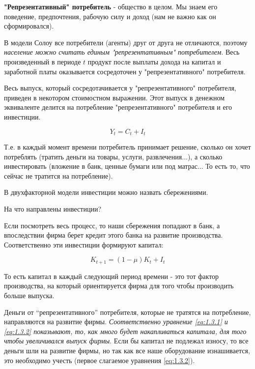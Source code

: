 \documentclass[reqno]{article}
\theoremstyle{definition}
\theoremstyle{definition}
\theoremstyle{definition}
\theoremstyle{definition}
\theoremstyle{definition}
\theoremstyle{definition}
\theoremstyle{definition}
\theoremstyle{definition}
\theoremstyle{definition}
\begin{document}
	\textbf{"Репрезентативный" потребитель} - общество в целом. Мы знаем его поведение, предпочтения, рабочую силу и доход (нам не важно как он сформировался).
	
	В модели Солоу все потребители (агенты) друг от друга не отличаются, поэтому \emph{население можно считать единым "репрезентативным" потребителем}. Весь произведенный в периоде $t$ продукт после выплаты дохода на капитал и заработной платы оказывается сосредоточен у "репрезентативного" потребителя.
	
	Весь выпуск, который сосредотачивается у "репрезентативного" потребителя, приведен в некотором стоимостном выражении. Этот выпуск в денежном эквиваленте делится на потребление "репрезентативного" потребителя и его инвестиции.
	
	\begin{equation}\label{eq:1.3.1}
		Y_t = C_t + I_t
	\end{equation}
	
	Т.е. в каждый момент времени потребитель принимает решение, сколько он хочет потреблять (тратить деньги на товары, услуги, развлечения...), а сколько инвестировать (вложение в банк, ценные бумаги или под матрас... То есть то, что сейчас не тратится на потребление).
	
	В двухфакторной модели инвестиции можно назвать сбережениями.\bigskip
	
	На что направлены инвестиции? 
	
	Если посмотреть весь процесс, то наши сбережения попадают в банк, а впоследствии фирма берет кредит этого банка на развитие производства. Соответственно эти инвестиции формируют капитал:
	
	\begin{equation}\label{eq:1.3.2}
		K_{t+1} = (1 - \mu) K_t + I_t
	\end{equation}
	
	То есть капитал в каждый следующий период времени - это тот фактор производства, на который ориентируется фирма для того чтобы производить больше выпуска.
	
	Деньги от ``репрезентативного'' потребителя, которые не тратятся на потребление, направляются на развитие фирмы.  \emph{Соответственно уравнение \ref{eq:1.3.1} и \ref{eq:1.3.2} показывают, то, как много будет накапливаться капитала, для того чтобы увеличивался выпуск фирмы}. Если бы капитал не подлежал износу, то все деньги шли на развитие фирмы, но так как все наше оборудование изнашивается, это необходимо учесть (первое слагаемое уравнения \ref{eq:1.3.2}).
	
\end{document}
